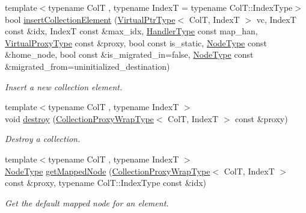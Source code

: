 \begin{DoxyCompactItemize}
{\footnotesize template$<$typename ColT , typename IndexT  = typename Col\+T\+::\+Index\+Type$>$ }\\bool \hyperlink{structvt_1_1vrt_1_1collection_1_1_collection_manager_a782ac8e2c943987c574df628364ff298}{insert\+Collection\+Element} (\hyperlink{structvt_1_1vrt_1_1collection_1_1_collection_manager_a1da9015e52d6ecca955f57b59aab0b82}{Virtual\+Ptr\+Type}$<$ ColT, IndexT $>$ vc, IndexT const \&idx, IndexT const \&max\+\_\+idx, \hyperlink{namespacevt_af64846b57dfcaf104da3ef6967917573}{Handler\+Type} const map\+\_\+han, \hyperlink{namespacevt_a1b417dd5d684f045bb58a0ede70045ac}{Virtual\+Proxy\+Type} const \&proxy, bool const is\+\_\+static, \hyperlink{namespacevt_a866da9d0efc19c0a1ce79e9e492f47e2}{Node\+Type} const \&home\+\_\+node, bool const \&is\+\_\+migrated\+\_\+in=false, \hyperlink{namespacevt_a866da9d0efc19c0a1ce79e9e492f47e2}{Node\+Type} const \&migrated\+\_\+from=uninitialized\+\_\+destination)
\begin{DoxyCompactList}\small\item\em Insert a new collection element. \end{DoxyCompactList}\item 
{\footnotesize template$<$typename ColT , typename IndexT $>$ }\\void \hyperlink{structvt_1_1vrt_1_1collection_1_1_collection_manager_ae6e458293d04d8b29697fa0584c84c67}{destroy} (\hyperlink{structvt_1_1vrt_1_1collection_1_1_collection_manager_a56458ed7f9bb22b631b9b3a745f42f94}{Collection\+Proxy\+Wrap\+Type}$<$ ColT, IndexT $>$ const \&proxy)
\begin{DoxyCompactList}\small\item\em Destroy a collection. \end{DoxyCompactList}\item 
{\footnotesize template$<$typename ColT , typename IndexT $>$ }\\\hyperlink{namespacevt_a866da9d0efc19c0a1ce79e9e492f47e2}{Node\+Type} \hyperlink{structvt_1_1vrt_1_1collection_1_1_collection_manager_ae333912da83d9beac8b710ec98e53094}{get\+Mapped\+Node} (\hyperlink{structvt_1_1vrt_1_1collection_1_1_collection_manager_a56458ed7f9bb22b631b9b3a745f42f94}{Collection\+Proxy\+Wrap\+Type}$<$ ColT, IndexT $>$ const \&proxy, typename Col\+T\+::\+Index\+Type const \&idx)
\begin{DoxyCompactList}\small\item\em Get the default mapped node for an element. \end{DoxyCompactList}\item 

\end{DoxyCompactItemize}
